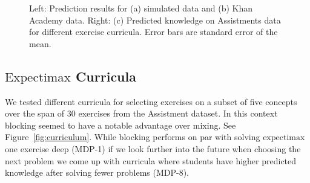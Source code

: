  \begin{figure}[t]
 \centering
 \caption{Left: Prediction results for (a) simulated data and (b) Khan Academy data. Right: (c) Predicted knowledge on Assistments data for different exercise curricula. Error bars are standard error of the mean.}

 \end{figure}

\subsection{$\mathrm{Expectimax}$ Curricula}\label{sec expectimax}

We tested different curricula for selecting exercises on a subset of five concepts over the span of 30 exercises from the Assistment dataset. In this context blocking seemed to have a notable advantage over mixing. See Figure~\ref{fig:curriculum}. While blocking performs on par with solving $\mathrm{expectimax}$ one exercise deep (MDP-1) if we look further into the future when choosing the next problem we come up with curricula where students have higher predicted knowledge after solving fewer problems (MDP-8). 


